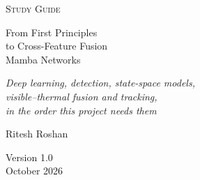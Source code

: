 \documentclass[11pt,a4paper,oneside,openany]{book}
\begin{document}
\frontmatter
\begin{titlepage}
\thispagestyle{empty}
\centering
\vspace*{34mm}
{\large\scshape\color{muted} Study Guide\par}
\vspace{20mm}
{\fontsize{29}{37}\selectfont From First Principles\\[2pt] to Cross-Feature Fusion\\[2pt] Mamba Networks\par}
\vspace{14mm}
{\Large\itshape Deep learning, detection, state-space models,\\[2pt] visible--thermal fusion and tracking,\\[2pt] in the order this project needs them\par}
\vspace{30mm}
{\large Ritesh Roshan\par}
\vfill
{\normalsize\color{muted} Version 1.0\\[2pt] October 2026\par}
\vspace{12mm}
\end{titlepage}

\cleardoublepage
{\tableofcontents}

\mainmatter








\appendix


\backmatter

\end{document}
